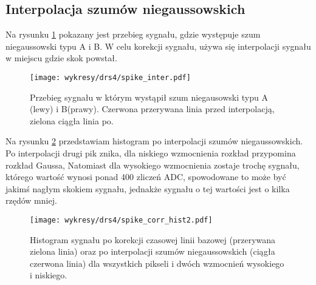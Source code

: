 \documentclass[a4paper,11pt,twoside]{article}
\begin{document}
\subsection{Interpolacja szumów niegaussowskich}
Na rysunku \ref{fig:spike_corr} pokazany jest przebieg sygnału, gdzie występuje szum niegaussowski typu A i B. W celu korekcji sygnału, używa się interpolacji sygnału w miejscu gdzie skok powstał.
\begin{figure}[H] 
\centering
\texttt{[image: wykresy/drs4/spike\_inter.pdf]}
\caption{Przebieg sygnału w którym wystąpił szum niegausowski typu A (lewy) i B(prawy). Czerwona przerywana linia przed interpolacją, zielona ciągła linia po.}
\label{fig:spike_corr}
\end{figure}
Na rysunku \ref{fig:spike_hist} przedstawiam histogram po interpolacji szumów niegaussowskich. Po interpolacji drugi pik znika, dla niskiego wzmocnienia rozkład przypomina rozkład Gaussa, Natomiast dla wysokiego wzmocnienia zostaje trochę sygnału, którego wartość wynosi ponad 400 zliczeń ADC, spowodowane to może być jakimś nagłym skokiem sygnału, jednakże sygnału o tej wartości jest o kilka rzędów mniej. 
\begin{figure}[H] 
\centering
\texttt{[image: wykresy/drs4/spike\_corr\_hist2.pdf]}
\caption{Histogram sygnału po korekcji czasowej linii bazowej (przerywana zielona linia) oraz po interpolacji szumów niegaussowskich (ciągła czerwona linia) dla wszystkich pikseli i dwóch wzmocnień wysokiego i niskiego.}
\label{fig:spike_hist}
\end{figure}
\end{document}

